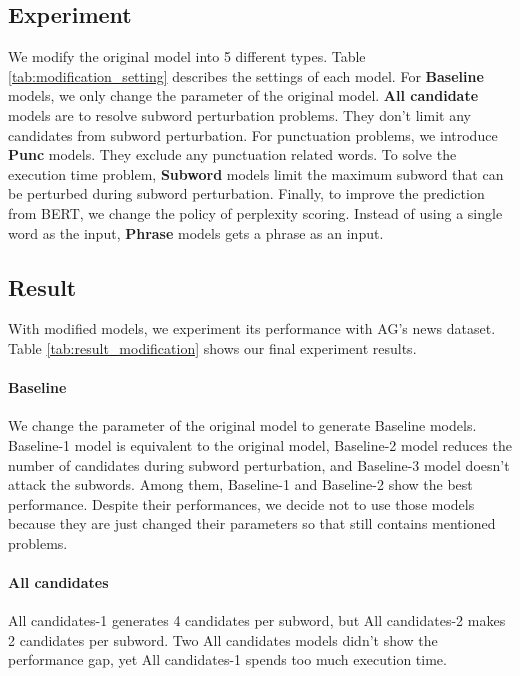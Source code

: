 \documentclass[11pt,a4paper]{article}
\begin{document}
\subsection{Experiment}

We modify the original model into 5 different types.
Table \ref{tab:modification_setting} describes the settings of each model.
For \textbf{Baseline} models, we only change the parameter of the original model.
\textbf{All candidate} models are to resolve subword perturbation problems. They don't limit any candidates from subword perturbation.
For punctuation problems, we introduce \textbf{Punc} models. They exclude any punctuation related words.
To solve the execution time problem, \textbf{Subword} models limit the maximum subword that can be perturbed during subword perturbation.
Finally, to improve the prediction from BERT, we change the policy of perplexity scoring. Instead of using a single word as the input, \textbf{Phrase} models gets a phrase as an input.



\subsection{Result}
\label{sec:improvement}
With modified models, we experiment its performance with AG's news dataset. 
Table \ref{tab:result_modification} shows our final experiment results.

\paragraph{Baseline} We change the parameter of the original model to generate Baseline models.
Baseline-1 model is equivalent to the original model, Baseline-2 model reduces the number of candidates during subword perturbation, and Baseline-3 model doesn't attack the subwords.
Among them, Baseline-1 and Baseline-2 show the best performance.
Despite their performances, we decide not to use those models because they are just changed their parameters so that still contains mentioned problems.

\paragraph{All candidates}
All candidates-1 generates 4 candidates per subword, but All candidates-2 makes 2 candidates per subword.
Two All candidates models didn't show the performance gap, yet All candidates-1 spends too much execution time.
\end{document}
